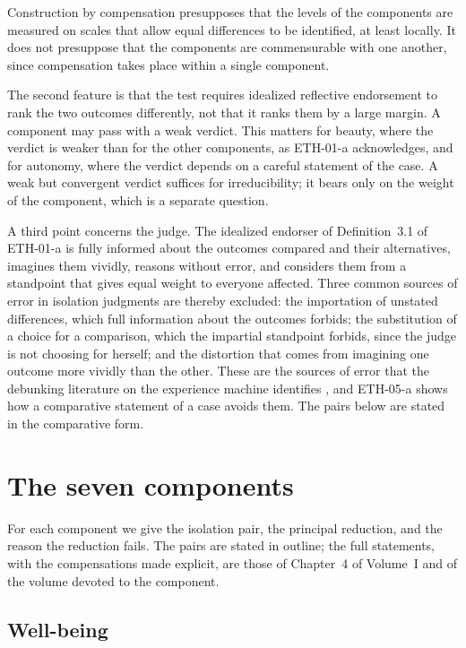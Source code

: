 \documentclass{situationist-preprint}
\begin{document}
\begin{remark}\label{r:comp}
Construction by compensation presupposes that the levels of the components are measured on scales that allow equal differences to be identified, at least locally. It does not presuppose that the components are commensurable with one another, since compensation takes place within a single component.
\end{remark}

The second feature is that the test requires idealized reflective endorsement to rank the two outcomes differently, not that it ranks them by a large margin. A component may pass with a weak verdict. This matters for beauty, where the verdict is weaker than for the other components, as ETH-01-a acknowledges, and for autonomy, where the verdict depends on a careful statement of the case. A weak but convergent verdict suffices for irreducibility; it bears only on the weight of the component, which is a separate question.

A third point concerns the judge. The idealized endorser of Definition~3.1 of ETH-01-a is fully informed about the outcomes compared and their alternatives, imagines them vividly, reasons without error, and considers them from a standpoint that gives equal weight to everyone affected. Three common sources of error in isolation judgments are thereby excluded: the importation of unstated differences, which full information about the outcomes forbids; the substitution of a choice for a comparison, which the impartial standpoint forbids, since the judge is not choosing for herself; and the distortion that comes from imagining one outcome more vividly than the other. These are the sources of error that the debunking literature on the experience machine identifies \citep{DeBrigard2010,Weijers2014}, and ETH-05-a shows how a comparative statement of a case avoids them. The pairs below are stated in the comparative form.

\section{The seven components}\label{s:components}

For each component we give the isolation pair, the principal reduction, and the reason the reduction fails. The pairs are stated in outline; the full statements, with the compensations made explicit, are those of Chapter~4 of Volume~I and of the volume devoted to the component.

\subsection{Well-being}
\end{document}
